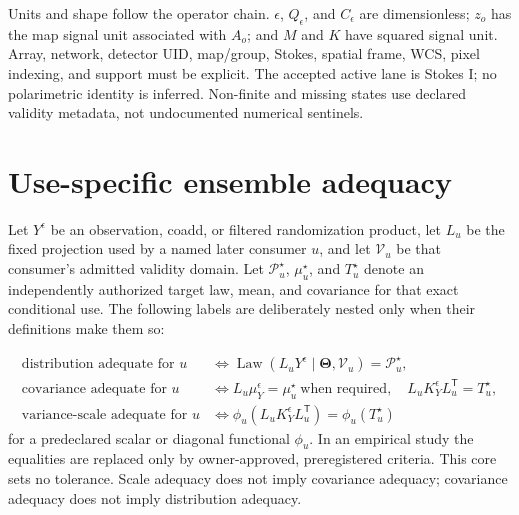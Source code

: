 \documentclass[11pt]{article}
\newcommand{\Law}{\operatorname{Law}}
\newcommand{\ThetaV}{\boldsymbol{\Theta}}
\begin{document}
Units and shape follow the operator chain.  $\epsilon$, $Q_\epsilon$, and
$C_\epsilon$ are dimensionless; $z_o$ has the map signal unit associated with
$A_o$; and $M$ and $K$ have squared signal unit.  Array, network, detector UID,
map/group, Stokes, spatial frame, WCS, pixel indexing, and support must be
explicit.  The accepted active lane is Stokes I; no polarimetric identity is
inferred.  Non-finite and missing states use declared validity metadata, not
undocumented numerical sentinels.

\section{Use-specific ensemble adequacy}

Let $Y^\epsilon$ be an observation, coadd, or filtered randomization product,
let $L_u$ be the fixed projection used by a named later consumer $u$, and let
$\mathcal V_u$ be that consumer's admitted validity domain.  Let
$\mathcal P_u^\star$, $\mu_u^\star$, and $T_u^\star$ denote an independently
authorized target law, mean, and covariance for that exact conditional use.
The following labels are deliberately nested only when their definitions make
them so:

\begin{align}
\text{distribution adequate for }u
&\iff
\Law(L_uY^\epsilon\mid\ThetaV,\mathcal V_u)
  =\mathcal P_u^\star,
\label{eq:distribution-adequacy}\\
\text{covariance adequate for }u
&\iff
L_u\mu_Y^\epsilon=\mu_u^\star\ \text{when required},\quad
L_uK_Y^\epsilon L_u^{\mathsf T}=T_u^\star,
\label{eq:covariance-adequacy}\\
\text{variance-scale adequate for }u
&\iff
\phi_u(L_uK_Y^\epsilon L_u^{\mathsf T})
=\phi_u(T_u^\star)
\label{eq:scale-adequacy}
\end{align}
for a predeclared scalar or diagonal functional $\phi_u$.  In an empirical
study the equalities are replaced only by owner-approved, preregistered
criteria.  This core sets no tolerance.  Scale adequacy does not imply
covariance adequacy; covariance adequacy does not imply distribution adequacy.
\end{document}
